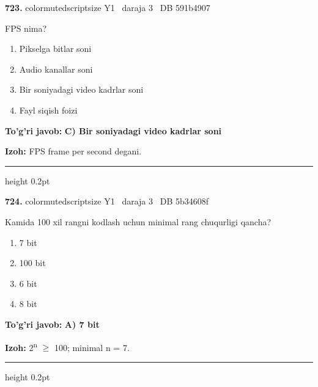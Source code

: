 \documentclass[10pt,a4paper,oneside]{article}
\begin{document}
\noindent\textbf{\color{ink}723.}  {color{muted}scriptsize Y1 \textbullet\ daraja 3 \textbullet\ DB 591b4907}
\par
FPS nima?
\begin{enumerate}[label=\Alph*),leftmargin=9mm]
\item Pikselga bitlar soni
\item Audio kanallar soni
\item Bir soniyadagi video kadrlar soni
\item Fayl siqish foizi
\end{enumerate}
\begin{tcolorbox}[enhanced,breakable,colback=teal!4,colframe=teal!50!black,boxrule=0.5pt,arc=1.1mm,left=3mm,right=3mm,top=1.7mm,bottom=1.7mm,before skip=2mm,after skip=2mm]
\textbf{\color{teal}To'g'ri javob:} \textbf{C) Bir soniyadagi video kadrlar soni}
\par\smallskip
\textbf{Izoh:} FPS frame per second degani.
\end{tcolorbox}
\vspace{2mm}\hrule height 0.2pt \vspace{3mm}

\noindent\textbf{\color{ink}724.}  {color{muted}scriptsize Y1 \textbullet\ daraja 3 \textbullet\ DB 5b34608f}
\par
Kamida 100 xil rangni kodlash uchun minimal rang chuqurligi qancha?
\begin{enumerate}[label=\Alph*),leftmargin=9mm]
\item 7 bit
\item 100 bit
\item 6 bit
\item 8 bit
\end{enumerate}
\begin{tcolorbox}[enhanced,breakable,colback=teal!4,colframe=teal!50!black,boxrule=0.5pt,arc=1.1mm,left=3mm,right=3mm,top=1.7mm,bottom=1.7mm,before skip=2mm,after skip=2mm]
\textbf{\color{teal}To'g'ri javob:} \textbf{A) 7 bit}
\par\smallskip
\textbf{Izoh:} 2\textsuperscript{n} \ensuremath{\geq} 100; minimal n = 7.
\end{tcolorbox}
\vspace{2mm}\hrule height 0.2pt \vspace{3mm}
\end{document}
